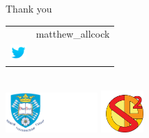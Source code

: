 \documentclass[table]{beamer}
\begin{document}
\begin{frame}
\centering
Thank you
\\
\vspace*{0.4in}
\large
\begin{tabular}{lr}
& \vspace*{-0.23in} \hspace*{-0.15in} matthew\_allcock \\
\includegraphics[height=0.6cm]{media/twitter-icon.png} &
\end{tabular}
\\
\vspace*{0.4in}
\includegraphics[height=1.5cm]{media/logo-sheffield-2.png}
\hspace*{0.3in}
\includegraphics[height=1.6cm]{media/sp2rc_logo2.png}
\end{frame}
\end{document}
